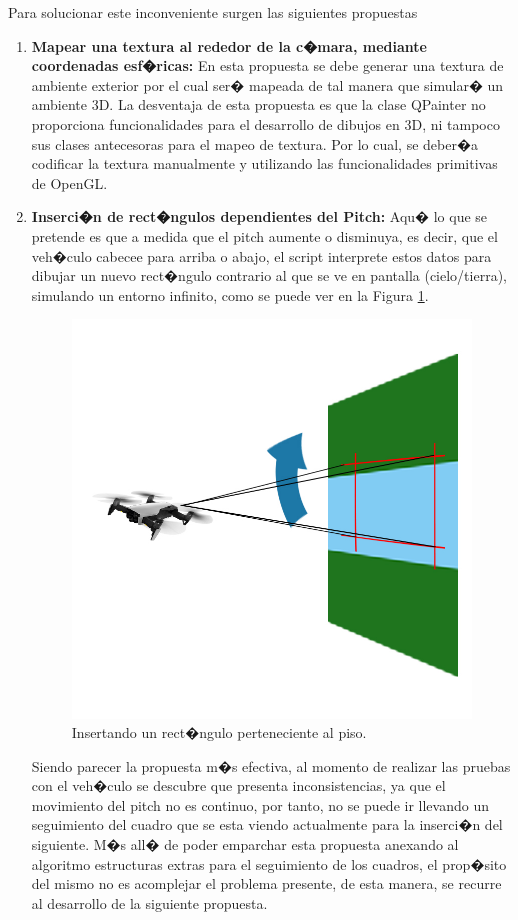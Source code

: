 \begin{enumerate}
\begin{enumerate}
		Para solucionar este inconveniente surgen las siguientes propuestas 
		
		\begin{enumerate}
			\item \textbf{Mapear una textura al rededor de la c�mara, mediante coordenadas esf�ricas: } En esta propuesta se debe generar una textura de ambiente exterior por el cual ser� mapeada de tal manera que simular� un ambiente 3D. La desventaja de esta propuesta es que la clase QPainter no proporciona funcionalidades para el desarrollo de dibujos en 3D, ni tampoco sus clases antecesoras para el mapeo de textura. Por lo cual, se deber�a codificar la textura manualmente y utilizando las funcionalidades primitivas de OpenGL.
			
			\item \textbf{Inserci�n de rect�ngulos dependientes del Pitch: } Aqu� lo que se pretende es que a medida que el pitch aumente o disminuya, es decir, que el veh�culo cabecee para arriba o abajo, el script interprete estos datos para dibujar un nuevo rect�ngulo contrario al que se ve en pantalla (cielo/tierra), simulando un entorno infinito, como se puede ver en la Figura \ref{fig:addrectangle}.
			
			\begin{figure}[h]
				\centering
				\includegraphics[width=0.4\linewidth, height=0.2\textheight]{Imagenes/addRectangle}
				\caption{Insertando un rect�ngulo perteneciente al piso. }
				\label{fig:addrectangle}
			\end{figure}
			
			Siendo parecer la propuesta m�s efectiva, al momento de realizar las pruebas con el veh�culo se descubre que presenta inconsistencias, ya que el movimiento del pitch no es continuo, por tanto, no se puede ir llevando un seguimiento del cuadro que se esta viendo actualmente para la inserci�n del siguiente. M�s all� de poder emparchar esta propuesta anexando al algoritmo estructuras extras para el seguimiento de los cuadros, el prop�sito del mismo no es acomplejar el problema presente, de esta manera, se recurre al desarrollo de la siguiente propuesta.
			

\end{enumerate}
\end{enumerate}
\end{enumerate}
